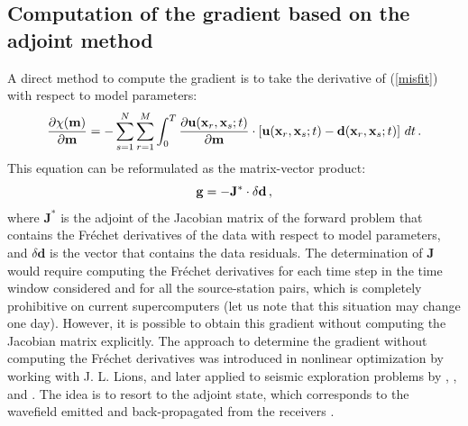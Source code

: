 \subsection{Computation of the gradient based on the adjoint method}

A direct method to compute the gradient is to take the derivative of (\ref{misfit}) with respect to model parameters:
\begin{equation}
\frac{\partial\chi(\mathbf{m})}{\partial\mathbf{m}} = -\sum_{s=1}^N\sum_{r=1}^M \int_0^T
\frac{\partial \mathbf{u}(\mathbf{x}_r, \mathbf{x}_s; t)}{\partial\mathbf{m}}\cdot\left[\mathbf{u}(\mathbf{x}_r, \mathbf{x}_s; t) - \mathbf{d}(\mathbf{x}_r, \mathbf{x}_s; t)\right] \, dt \, .
\label{calc_gradient}
\end{equation}
This equation can be reformulated as the matrix-vector product:
\begin{equation}
\mathbf{g} = -\mathbf{J}^* \cdot \delta \mathbf{d} \, ,
\label{Jacobian}
\end{equation}
where $\mathbf{J}^*$ is the adjoint of the Jacobian matrix of the forward problem that contains the Fr\'echet derivatives of the
data with respect to model parameters, and $\delta \mathbf{d}$ is the vector that contains the data residuals.
The determination of $\mathbf{J}$ would require computing the Fr\'echet derivatives for each time step in the time
window considered and for all the source-station pairs, which is completely prohibitive on current supercomputers
(let us note that this situation may change one day).
However, it is possible to obtain this gradient without computing the Jacobian matrix explicitly.
The approach to determine the gradient without computing the Fr\'echet derivatives was introduced in nonlinear optimization
by \cite{Cha74} working with J. L. Lions, and later applied to seismic exploration problems by
\cite{BaChLa77}, \cite{BaChHeLa82}, \cite{Lai83} and \cite{Tar84}. The idea is to resort to the adjoint state,
which corresponds to the wavefield emitted and back-propagated from the receivers \cite[e.g.,][]{TrTaLi05,TrKoLi08,Plessix_2006_RAS,FiBuIg06}.

